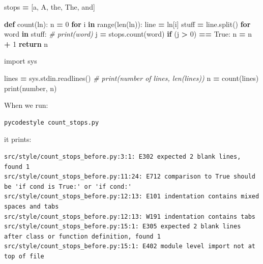\documentclass[
]{krantz}
\makeatletter
\newenvironment{Shaded}{\begin{snugshade}}{\end{snugshade}}
\newcommand{\BuiltInTok}[1]{#1}
\newcommand{\CommentTok}[1]{\textcolor[rgb]{0.56,0.35,0.01}{\textit{#1}}}
\newcommand{\ControlFlowTok}[1]{\textcolor[rgb]{0.13,0.29,0.53}{\textbf{#1}}}
\newcommand{\DecValTok}[1]{\textcolor[rgb]{0.00,0.00,0.81}{#1}}
\newcommand{\ImportTok}[1]{#1}
\newcommand{\KeywordTok}[1]{\textcolor[rgb]{0.13,0.29,0.53}{\textbf{#1}}}
\newcommand{\NormalTok}[1]{#1}
\newcommand{\OperatorTok}[1]{\textcolor[rgb]{0.81,0.36,0.00}{\textbf{#1}}}
\newcommand{\StringTok}[1]{\textcolor[rgb]{0.31,0.60,0.02}{#1}}
\newcommand{\VariableTok}[1]{\textcolor[rgb]{0.00,0.00,0.00}{#1}}
\newenvironment{kframe}{%
\medskip{}
\setlength{\fboxsep}{.8em}
 \def\at@end@of@kframe{}%
 \ifinner\ifhmode%
  \def\at@end@of@kframe{\end{minipage}}%
  \begin{minipage}{\columnwidth}%
 \fi\fi%
 \def\FrameCommand##1{\hskip\@totalleftmargin \hskip-\fboxsep
 \colorbox{shadecolor}{##1}\hskip-\fboxsep
     \hskip-\linewidth \hskip-\@totalleftmargin \hskip\columnwidth}%
 \MakeFramed {\advance\hsize-\width
   \@totalleftmargin\z@ \linewidth\hsize
   \@setminipage}}%
 {\par\unskip\endMakeFramed%
 \at@end@of@kframe}
\renewenvironment{Shaded}{\begin{kframe}}{\end{kframe}}
\makeatother
\begin{document}
\begin{Shaded}
\begin{Highlighting}[]
\NormalTok{stops }\OperatorTok{=}\NormalTok{ [}\StringTok{\textquotesingle{}a\textquotesingle{}}\NormalTok{, }\StringTok{\textquotesingle{}A\textquotesingle{}}\NormalTok{, }\StringTok{\textquotesingle{}the\textquotesingle{}}\NormalTok{, }\StringTok{\textquotesingle{}The\textquotesingle{}}\NormalTok{, }\StringTok{\textquotesingle{}and\textquotesingle{}}\NormalTok{]}

\KeywordTok{def}\NormalTok{ count(ln):}
\NormalTok{    n }\OperatorTok{=} \DecValTok{0}
    \ControlFlowTok{for}\NormalTok{ i }\KeywordTok{in} \BuiltInTok{range}\NormalTok{(}\BuiltInTok{len}\NormalTok{(ln)):}
\NormalTok{        line }\OperatorTok{=}\NormalTok{ ln[i]}
\NormalTok{        stuff }\OperatorTok{=}\NormalTok{ line.split()}
        \ControlFlowTok{for}\NormalTok{ word }\KeywordTok{in}\NormalTok{ stuff:}
            \CommentTok{\# print(word)}
\NormalTok{            j }\OperatorTok{=}\NormalTok{ stops.count(word)}
            \ControlFlowTok{if}\NormalTok{ (j }\OperatorTok{\textgreater{}} \DecValTok{0}\NormalTok{) }\OperatorTok{==} \VariableTok{True}\NormalTok{:}
\NormalTok{                n }\OperatorTok{=}\NormalTok{ n }\OperatorTok{+} \DecValTok{1}
    \ControlFlowTok{return}\NormalTok{ n}

\ImportTok{import}\NormalTok{ sys}

\NormalTok{lines }\OperatorTok{=}\NormalTok{ sys.stdin.readlines()}
\CommentTok{\# print(\textquotesingle{}number of lines\textquotesingle{}, len(lines))}
\NormalTok{n }\OperatorTok{=}\NormalTok{ count(lines)}
\BuiltInTok{print}\NormalTok{(}\StringTok{\textquotesingle{}number\textquotesingle{}}\NormalTok{, n)}
\end{Highlighting}
\end{Shaded}

When we run:

\begin{verbatim}
pycodestyle count_stops.py
\end{verbatim}

it prints:

\begin{verbatim}
src/style/count_stops_before.py:3:1: E302 expected 2 blank lines, found 1
src/style/count_stops_before.py:11:24: E712 comparison to True should be 'if cond is True:' or 'if cond:'
src/style/count_stops_before.py:12:13: E101 indentation contains mixed spaces and tabs
src/style/count_stops_before.py:12:13: W191 indentation contains tabs
src/style/count_stops_before.py:15:1: E305 expected 2 blank lines after class or function definition, found 1
src/style/count_stops_before.py:15:1: E402 module level import not at top of file
\end{verbatim}
\end{document}
